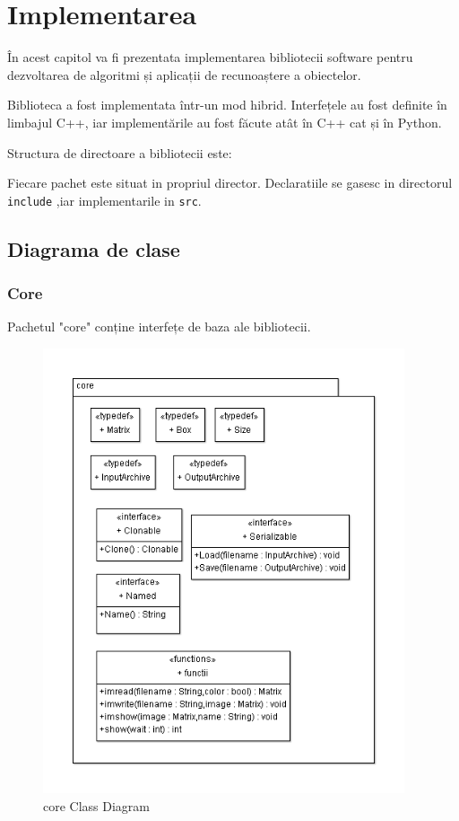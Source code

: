 \chapter{Implementarea}

În acest capitol va fi prezentata implementarea bibliotecii software pentru dezvoltarea de algoritmi și aplicații de recunoaștere a obiectelor.

Biblioteca a fost implementata într-un mod hibrid.
Interfețele au fost definite în limbajul C++, iar implementările au fost făcute atât în C++ cat și în Python.

Structura de directoare a bibliotecii este:

Fiecare pachet este situat in propriul director.
Declaratiile se gasesc in directorul \verb!include!
,iar implementarile in \verb!src!.

\pagebreak
\section{Diagrama de clase}

\subsection{Core}
Pachetul "core" conține interfețe de baza ale bibliotecii.
\begin{figure}[H]
	\centering
		\includegraphics[width=0.95\textwidth]{uml/coreClassDiagram.png}
	\caption{core Class Diagram}
	\label{fig:coreClassDiagram}
\end{figure}

